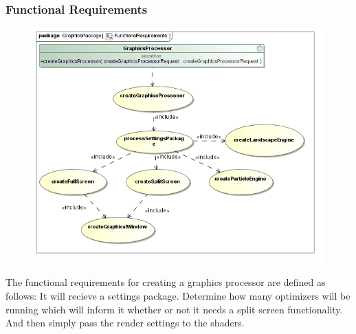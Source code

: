 \documentclass[11pt]{article}
\begin{document}
\subsubsection{Functional Requirements}
\begin{figure}[H]
\includegraphics[scale=0.45]{GraphicsProcessor/FunctionalRequirements.jpg}
\end{figure}
The functional requirements for creating a graphics processor are defined as follows:
It will recieve a settings package. Determine how many optimizers will be running which will inform it whether or not it needs a split screen functionality. And then simply pass the render settings to the shaders.
\end{document}
